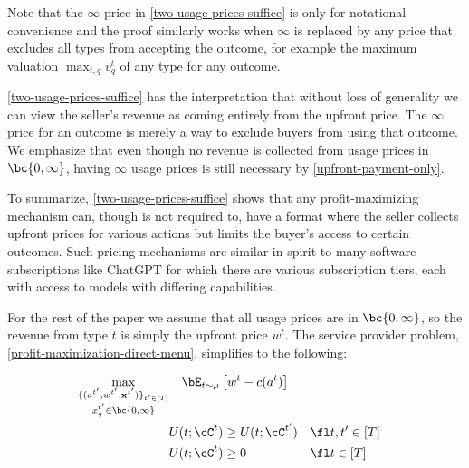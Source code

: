Note that the $\infty$ price in \cref{two-usage-prices-suffice} is only for notational convenience and the proof similarly works when $\infty$ is replaced by any price that excludes all types from accepting the outcome, for example the maximum valuation $\max_{t,q} v^t_q$ of any type for any outcome.

\begin{remark*}
\cref{two-usage-prices-suffice} has the interpretation that without loss of generality we can view the seller's revenue as coming entirely from the upfront price. The $\infty$ price for an outcome is merely a way to exclude buyers from using that outcome. We emphasize that even though no revenue is collected from usage prices in $\bc{0,\infty}$, having $\infty$ usage prices is still necessary by \cref{upfront-payment-only}.
\end{remark*}

To summarize, \cref{two-usage-prices-suffice} shows that any profit-maximizing mechanism can, though is not required to, have a format where the seller collects upfront prices for various actions but limits the buyer's access to certain outcomes. Such pricing mechanisms are similar in spirit to many software subscriptions like ChatGPT for which there are various subscription tiers, each with access to models with differing capabilities.


For the rest of the paper we assume that all usage prices are in $\bc{0,\infty}$, so the revenue from type $t$ is simply the upfront price $w^t$. The service provider problem, \cref{profit-maximization-direct-menu}, simplifies to the following:

\begin{tcolorbox}[title=Maximizing profit of a direct menu with usage prices in $\bc{0,\infty}$]
    \begin{align}
             \max_{ \substack{\{(a^{t'}, w^{t'}, \mathbf{x}^{t'}) \}_{{t'} \in [T]} \\ x^{t'}_q\in \bc{0,\infty}}} & \quad \bE_{t \sim \mu} \left[ w^t  - c(a^t)
    \right] \label{binary-optimization-problem} \\ 
        & U(t; \cC^t) \geq U(t; \cC^{t'}) && \fl t, t' \in [T]   \notag \\ 
        & U(t; \cC^t) \geq 0  && \fl t  \in [T]  \notag
          \end{align}   
\end{tcolorbox}

